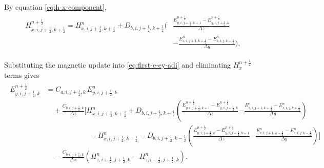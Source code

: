 \documentclass{article}
\numberwithin{equation}{section}
\numberwithin{figure}{section}
\begin{document}
By equation \eqref{eq:h-x-component},
\begin{align}
    \begin{split}
        H_{x,i,j+\tfrac12,k+\tfrac12}^{n+\frac12} = H_{x,i,j+\tfrac12,k+\tfrac12}^{n} + D_{b,i,j+\tfrac12,k+\tfrac12}\Big( & \frac{E_{y,i,j+\tfrac12,k+1}^{n+\frac12}-E_{y,i,j+\tfrac12,k}^{n+\frac12}}{\Delta z} \\
                                                                                                                           & - \frac{E_{z,i,j+1,k+\tfrac12}^{n}-E_{z,i,j,k+\tfrac12}^{n}}{\Delta y}\Big),
    \end{split}
\end{align}

Substituting the magnetic update into \eqref{eq:first-e-ey-adi} and eliminating $H_{x}^{n+\frac12}$ terms gives
\begin{align}
    \begin{split}
        E_{y,i,j+\tfrac12,k}^{n+\frac12} & = C_{a,i,j+\tfrac12,k}\,E_{y,i,j+\tfrac12,k}^{n}                                                                                                                                                                                                                                                           \\
                                         & \quad + \frac{C_{b,i,j+\tfrac12,k}}{\Delta z}\Bigg[H_{x,i,j+\tfrac12,k+\tfrac12}^{n} + D_{b,i,j+\tfrac12,k+\tfrac12}\left(\frac{E_{y,i,j+\tfrac12,k+1}^{n+\frac12}-E_{y,i,j+\tfrac12,k}^{n+\frac12}}{\Delta z}\right. \left. - \frac{E_{z,i,j+1,k+\tfrac12}^{n}-E_{z,i,j,k+\tfrac12}^{n}}{\Delta y}\right) \\
                                         & \qquad\qquad\qquad - H_{x,i,j+\tfrac12,k-\tfrac12}^{n} - D_{b,i,j+\tfrac12,k-\tfrac12}\left(\frac{E_{y,i,j+\tfrac12,k}^{n+\frac12}-E_{y,i,j+\tfrac12,k-1}^{n+\frac12}}{\Delta z}\right. \left. - \frac{E_{z,i,j+1,k-\tfrac12}^{n}-E_{z,i,j,k-\tfrac12}^{n}}{\Delta y}\right)\Bigg]                         \\
                                         & \quad - \frac{C_{b,i,j+\tfrac12,k}}{\Delta x}\left(H_{z,i+\tfrac12,j+\tfrac12,k}^{n}-H_{z,i-\tfrac12,j+\tfrac12,k}^{n}\right).
    \end{split}
\end{align}
\end{document}
